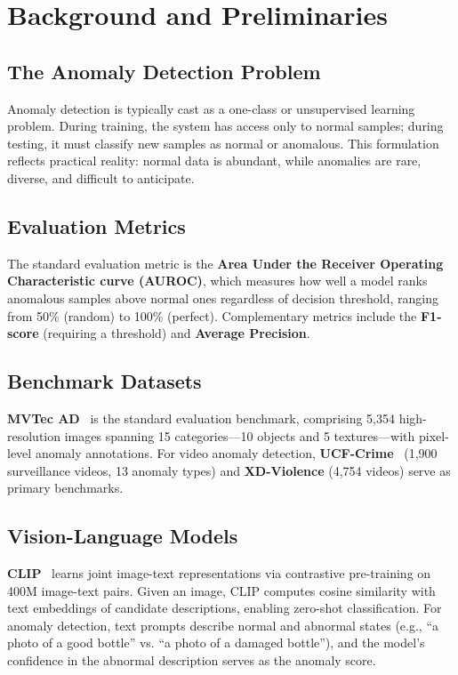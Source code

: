 \documentclass[conference]{IEEEtran}
\begin{document}
\section{Background and Preliminaries}
\label{sec:background}

\subsection{The Anomaly Detection Problem}

Anomaly detection is typically cast as a one-class or unsupervised learning problem. During training, the system has access only to normal samples; during testing, it must classify new samples as normal or anomalous. This formulation reflects practical reality: normal data is abundant, while anomalies are rare, diverse, and difficult to anticipate.

\subsection{Evaluation Metrics}

The standard evaluation metric is the \textbf{Area Under the Receiver Operating Characteristic curve (AUROC)}, which measures how well a model ranks anomalous samples above normal ones regardless of decision threshold, ranging from 50\% (random) to 100\% (perfect). Complementary metrics include the \textbf{F1-score} (requiring a threshold) and \textbf{Average Precision}.

\subsection{Benchmark Datasets}

\textbf{MVTec AD}~\cite{bergmann2019mvtec} is the standard evaluation benchmark, comprising 5,354 high-resolution images spanning 15 categories---10 objects and 5 textures---with pixel-level anomaly annotations. For video anomaly detection, \textbf{UCF-Crime}~\cite{sultani2018ucf} (1,900 surveillance videos, 13 anomaly types) and \textbf{XD-Violence} (4,754 videos) serve as primary benchmarks.

\subsection{Vision-Language Models}

\textbf{CLIP}~\cite{radford2021clip} learns joint image-text representations via contrastive pre-training on 400M image-text pairs. Given an image, CLIP computes cosine similarity with text embeddings of candidate descriptions, enabling zero-shot classification. For anomaly detection, text prompts describe normal and abnormal states (e.g., ``a photo of a good bottle'' vs. ``a photo of a damaged bottle''), and the model's confidence in the abnormal description serves as the anomaly score.

\end{document}
